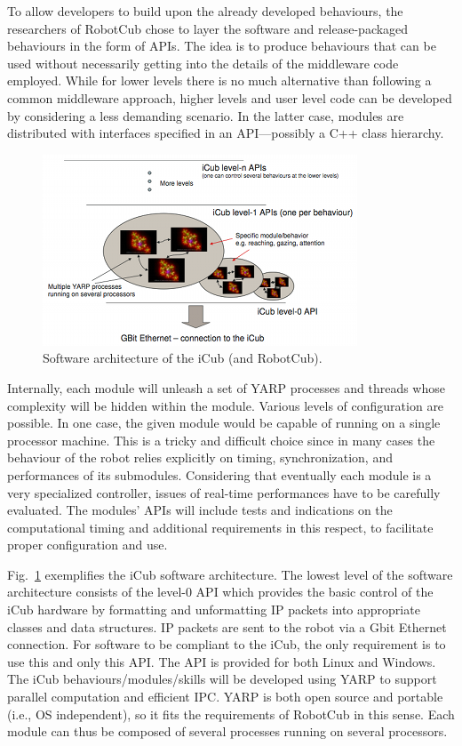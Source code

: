 To allow developers to build upon the already developed behaviours, the researchers of \ac{RobotCub} chose to layer the software and release-packaged behaviours in the form of \acp{API}. The idea is to produce behaviours that can be used without necessarily getting into the details of the middleware code employed. While for lower levels there is no much alternative than following a common middleware approach, higher levels and user level code can be developed by considering a less demanding scenario. In the latter case, modules are distributed with interfaces specified in an \ac{API}---possibly a C++ class hierarchy.

\begin{figure}
\centering
\includegraphics{figures/icub_sw_arch}
\caption[Software architecture of the iCub]{Software architecture of the iCub (and \acs{RobotCub}).}
\label{img:icub_sw_arch}
\end{figure}

Internally, each module will unleash a set of YARP processes and threads whose complexity will be hidden within the module. Various levels of configuration are possible. In one case, the given module would be capable of running on a single processor machine. This is a tricky and difficult choice since in many cases the behaviour of the robot relies explicitly on timing, synchronization, and performances of its submodules. Considering that eventually each module is a very specialized controller, issues of real-time performances have to be carefully evaluated. The modules' \acp{API} will include tests and indications on the computational timing and additional requirements in this respect, to facilitate proper configuration and use.

Fig.~\ref{img:icub_sw_arch} exemplifies the iCub software architecture. The lowest level of the software architecture consists of the level-0 \ac{API} which provides the basic control of the iCub hardware by formatting and unformatting IP packets into appropriate classes and data structures. IP packets are sent to the robot via a Gbit Ethernet connection. For software to be compliant to the iCub, the only requirement is to use this and only this \ac{API}. The \ac{API} is provided for both Linux and Windows. The iCub behaviours/modules/skills will be developed using \ac{YARP} to support parallel computation and efficient \ac{IPC}. \ac{YARP} is both open source and portable (i.e., OS independent), so it fits the requirements of \ac{RobotCub} in this sense. Each module can thus be composed of several processes running on several processors. 


